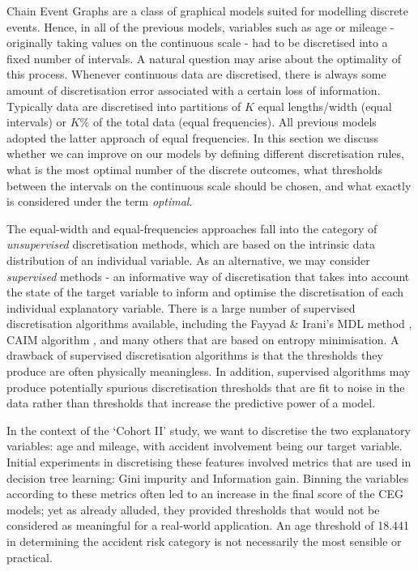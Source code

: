 \documentclass[runningheads]{llncs}
\begin{document}
Chain Event Graphs are a class of graphical models suited for modelling discrete events. Hence, in all of the previous models, variables such as age or mileage - originally taking values on the continuous scale - had to be discretised into a fixed number of intervals. A natural question may arise about the optimality of this process. Whenever continuous data are discretised, there is always some amount of discretisation error associated with a certain loss of information. Typically data are discretised into partitions of $K$ equal lengths/width (equal intervals) or $K\%$ of the total data (equal frequencies). All previous models adopted the latter approach of equal frequencies. In this section we discuss whether we can improve on our models by defining different discretisation rules, what is the most optimal number of the discrete outcomes, what thresholds between the intervals on the continuous scale should be chosen, and what exactly is considered under the term \emph{optimal}.

The equal-width and equal-frequencies approaches fall into the category of \emph{unsupervised} discretisation methods, which are based on the intrinsic data distribution of an individual variable. As an alternative, we may consider \emph{supervised} methods - an informative way of discretisation that takes into account the state of the target variable to inform and optimise the discretisation of each individual explanatory variable. There is a large number of supervised discretisation algorithms available, including the Fayyad \& Irani's MDL method \cite{fayyad1993discretization}, CAIM algorithm \cite{kurgan2004caim}, and many others that are based on entropy minimisation. A drawback of supervised discretisation algorithms is that the thresholds they produce are often physically meaningless. In addition, supervised algorithms may produce potentially spurious discretisation thresholds that are fit to noise in the data rather than thresholds that increase the predictive power of a model. 

In the context of the `Cohort II' study, we want to discretise the two explanatory variables: age and mileage, with accident involvement being our target variable. Initial experiments in discretising these features involved metrics that are used in decision tree learning: Gini impurity and Information gain. Binning the variables according to these metrics often led to an increase in the final score of the CEG models; yet as already alluded, they provided thresholds that would not be considered as meaningful for a real-world application. An age threshold of 18.441 in determining the accident risk category is not necessarily the most sensible or practical.
\end{document}

